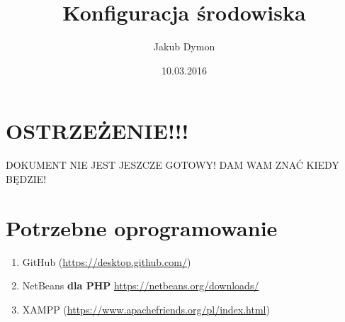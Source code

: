 \documentclass[a4paper, 11pt]{article}
\title{Konfiguracja środowiska}
\author{Jakub Dymon}
\date{10.03.2016}
\begin{document}
	\maketitle
	\section{OSTRZEŻENIE!!!}
	\begin{Large}
		DOKUMENT NIE JEST JESZCZE GOTOWY! DAM WAM ZNAĆ KIEDY BĘDZIE!
	\end{Large}
	\section{Potrzebne oprogramowanie}
	\begin{enumerate}
		\item GitHub (\url{https://desktop.github.com/})
		\item NetBeans \textbf{dla PHP} {\url{https://netbeans.org/downloads/}}
		\item XAMPP (\url{https://www.apachefriends.org/pl/index.html})
	\end{enumerate}
\end{document}
